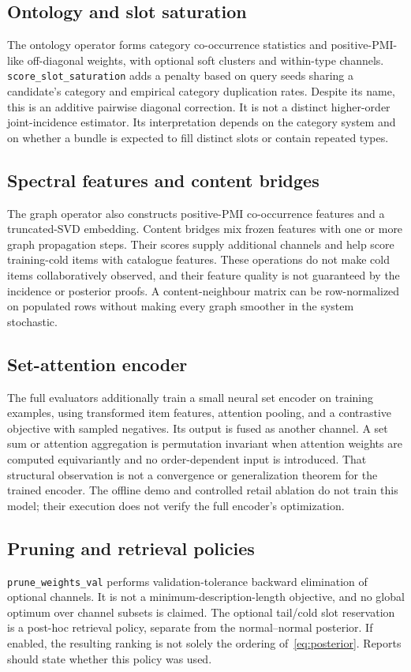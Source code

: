 \documentclass[11pt,a4paper]{article}
\theoremstyle{remark}
\newcommand{\code}[1]{\texttt{\small #1}}
\begin{document}
\subsection{Ontology and slot saturation}
The ontology operator forms category co-occurrence statistics and
positive-PMI-like off-diagonal weights, with optional soft clusters and
within-type channels. \code{score\_slot\_saturation} adds a penalty based
on query seeds sharing a candidate's category and empirical category
duplication rates. Despite its name, this is an additive pairwise diagonal
correction. It is not a distinct higher-order joint-incidence estimator.
Its interpretation depends on the category system and on whether a
bundle is expected to fill distinct slots or contain repeated types.

\subsection{Spectral features and content bridges}
The graph operator also constructs positive-PMI co-occurrence features
and a truncated-SVD embedding. Content bridges mix frozen features with
one or more graph propagation steps. Their scores supply additional
channels and help score training-cold items with catalogue features.
These operations do not make cold items collaboratively observed, and
their feature quality is not guaranteed by the incidence or posterior
proofs. A content-neighbour matrix can be row-normalized on populated
rows without making every graph smoother in the system stochastic.

\subsection{Set-attention encoder}
The full evaluators additionally train a small neural set encoder on
training examples, using transformed item features, attention pooling,
and a contrastive objective with sampled negatives. Its output is fused
as another channel. A set sum or attention aggregation is permutation
invariant when attention weights are computed equivariantly and no
order-dependent input is introduced. That structural observation is
not a convergence or generalization theorem for the trained encoder.
The offline demo and controlled retail ablation do not train this model;
their execution does not verify the full encoder's optimization.

\subsection{Pruning and retrieval policies}
\code{prune\_weights\_val} performs validation-tolerance backward
elimination of optional channels. It is not a minimum-description-length
objective, and no global optimum over channel subsets is claimed.
The optional tail/cold slot reservation is a post-hoc retrieval policy,
separate from the normal--normal posterior. If enabled, the resulting
ranking is not solely the ordering of~\eqref{eq:posterior}. Reports
should state whether this policy was used.
\end{document}

